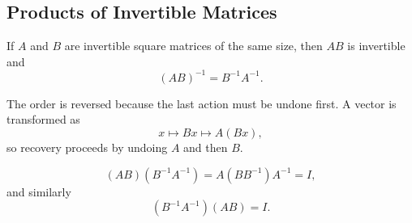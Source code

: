 \subsection{Products of Invertible Matrices}

\begin{theorembox}
If $A$ and $B$ are invertible square matrices of the same size, then $AB$ is invertible and
\[
\boxed{(AB)^{-1}=B^{-1}A^{-1}}.
\]
\end{theorembox}

The order is reversed because the last action must be undone first. A vector is transformed as
\[
x\longmapsto Bx\longmapsto A(Bx),
\]
so recovery proceeds by undoing $A$ and then $B$.

\begin{proofbox}[Verification]
\[
(AB)(B^{-1}A^{-1})=A(BB^{-1})A^{-1}=I,
\]
and similarly
\[
(B^{-1}A^{-1})(AB)=I.
\]
\end{proofbox}
